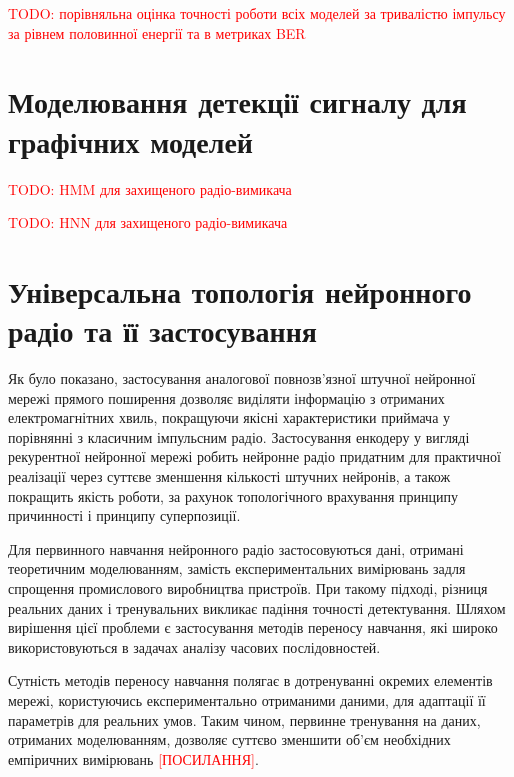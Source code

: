 \textcolor{red}{TODO: порівняльна оцінка точності роботи всіх моделей за 
тривалістю імпульсу за рівнем половинної енергії та в метриках BER}

\section{Моделювання детекції сигналу для графічних моделей}

\textcolor{red}{TODO: HMM для захищеного радіо-вимикача}

\textcolor{red}{TODO: HNN для захищеного радіо-вимикача}

\section{Універсальна топологія нейронного радіо та її застосування}

Як було показано, застосування аналогової повнозв'язної штучної нейронної 
мережі прямого поширення дозволяє виділяти інформацію з отриманих 
електромагнітних хвиль, покращуючи якісні характеристики приймача у 
порівнянні з класичним імпульсним радіо. Застосування енкодеру у вигляді 
рекурентної нейронної мережі робить нейронне радіо придатним для практичної 
реалізації через суттєве зменшення кількості штучних нейронів, а також 
покращить якість роботи, за рахунок топологічного врахування принципу 
причинності і принципу суперпозиції.

Для первинного навчання нейронного радіо застосовуються дані, отримані 
теоретичним моделюванням, замість експериментальних вимірювань задля спрощення 
промислового виробництва пристроїв. При такому підході,
різниця реальних даних і тренувальних викликає падіння точності детектування.
Шляхом вирішення цієї проблеми є застосування методів переносу навчання, які 
широко використовуються в задачах аналізу часових послідовностей. 

Сутність методів переносу навчання полягає в дотренуванні окремих елементів 
мережі, користуючись експериментально отриманими даними, для адаптації її 
параметрів для реальних умов. Таким чином, первинне тренування на даних,
отриманих моделюванням, дозволяє суттєво зменшити об'єм необхідних 
емпіричних вимірювань \textcolor{red}{[ПОСИЛАННЯ]}.

